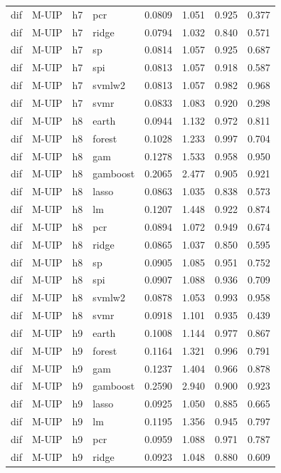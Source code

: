 \begin{ThreePartTable}
\begin{longtable}[t]{llclcccc}
dif & M-UIP & h7 & pcr & 0.0809 & 1.051 & 0.925 & 0.377\\
dif & M-UIP & h7 & ridge & 0.0794 & 1.032 & 0.840 & 0.571\\
dif & M-UIP & h7 & sp & 0.0814 & 1.057 & 0.925 & 0.687\\
dif & M-UIP & h7 & spi & 0.0813 & 1.057 & 0.918 & 0.587\\
dif & M-UIP & h7 & svmlw2 & 0.0813 & 1.057 & 0.982 & 0.968\\
dif & M-UIP & h7 & svmr & 0.0833 & 1.083 & 0.920 & 0.298\\
\addlinespace
dif & M-UIP & h8 & earth & 0.0944 & 1.132 & 0.972 & 0.811\\
dif & M-UIP & h8 & forest & 0.1028 & 1.233 & 0.997 & 0.704\\
dif & M-UIP & h8 & gam & 0.1278 & 1.533 & 0.958 & 0.950\\
dif & M-UIP & h8 & gamboost & 0.2065 & 2.477 & 0.905 & 0.921\\
dif & M-UIP & h8 & lasso & 0.0863 & 1.035 & 0.838 & 0.573\\
dif & M-UIP & h8 & lm & 0.1207 & 1.448 & 0.922 & 0.874\\
dif & M-UIP & h8 & pcr & 0.0894 & 1.072 & 0.949 & 0.674\\
dif & M-UIP & h8 & ridge & 0.0865 & 1.037 & 0.850 & 0.595\\
dif & M-UIP & h8 & sp & 0.0905 & 1.085 & 0.951 & 0.752\\
dif & M-UIP & h8 & spi & 0.0907 & 1.088 & 0.936 & 0.709\\
dif & M-UIP & h8 & svmlw2 & 0.0878 & 1.053 & 0.993 & 0.958\\
dif & M-UIP & h8 & svmr & 0.0918 & 1.101 & 0.935 & 0.439\\
\addlinespace
dif & M-UIP & h9 & earth & 0.1008 & 1.144 & 0.977 & 0.867\\
dif & M-UIP & h9 & forest & 0.1164 & 1.321 & 0.996 & 0.791\\
dif & M-UIP & h9 & gam & 0.1237 & 1.404 & 0.966 & 0.878\\
dif & M-UIP & h9 & gamboost & 0.2590 & 2.940 & 0.900 & 0.923\\
dif & M-UIP & h9 & lasso & 0.0925 & 1.050 & 0.885 & 0.665\\
dif & M-UIP & h9 & lm & 0.1195 & 1.356 & 0.945 & 0.797\\
dif & M-UIP & h9 & pcr & 0.0959 & 1.088 & 0.971 & 0.787\\
dif & M-UIP & h9 & ridge & 0.0923 & 1.048 & 0.880 & 0.609\\

\end{longtable}
\end{ThreePartTable}
